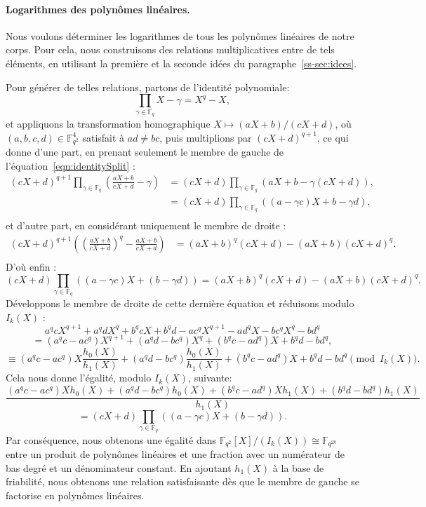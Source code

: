 \documentclass[a4paper, titlepage, 11pt]{article}
\theoremstyle{definition}
\theoremstyle{remark}
\def\gf #1{\mathbb{F}_{#1}}
\begin{document}
\paragraph{Logarithmes des polynômes linéaires.}Nous voulons déterminer les logarithmes de tous les polynômes linéaires de notre corps. Pour cela, nous construisons des relations multiplicatives entre de tels éléments, en utilisant la première et la seconde idées du paragraphe~\ref{ss-sec:idees}.

Pour générer de telles relations, partons de l'identité polynomiale:
\begin{equation}\label{eqn:identitySplit}
\prod_{\gamma\in\gf{q}} X-\gamma = X^q-X,
\end{equation}
et appliquons la transformation homographique $X \mapsto (aX+b)/(cX+d)$, où $(a,b,c,d)\in\gf{q^2}^4$ satisfait à $ad\neq bc$, puis multiplions par $(cX+d)^{q+1}$, ce qui donne d'une part, en prenant seulement le membre de gauche de l'équation~\ref{eqn:identitySplit} :
\begin{align*}
(cX+d)^{q+1} \prod_{\gamma\in\gf{q}} \left(\frac{aX+b}{cX+d}-\gamma\right) &= (cX+d) \prod_{\gamma\in\gf{q}} (aX+b-\gamma(cX+d)), \\ 
&= (cX+d) \prod_{\gamma\in\gf{q}} ((a-\gamma c)X+b-\gamma d),\\
\end{align*}
et d'autre part, en considérant uniquement le membre de droite :
\begin{align*}
(cX+d)^{q+1}\left({\left(\frac{aX+b}{cX+d}\right)}^q - \frac{aX+b}{cX+d}\right) &= (aX+b)^q(cX+d) - (aX+b)(cX+d)^q. \\
\end{align*}
D'où enfin :
$$(cX+d) \prod_{\gamma\in\gf{q}}((a-\gamma c)X + (b-\gamma d)) = (aX+b)^q(cX+d) - (aX+b)(cX+d)^q.$$
Développons le membre de droite de cette dernière équation et réduisons modulo $I_k(X)$ :
$$a^qcX^{q+1} + a^qdX^q + b^qcX + b^qd - ac^qX^{q+1} - ad^qX - bc^qX^q - bd^q$$
$$= (a^qc - ac^q)X^{q+1} + (a^qd - bc^q)X^q + (b^qc - ad^q)X + b^qd - bd^q,$$
$$\equiv (a^qc - ac^q)X\frac{h_0(X)}{h_1(X)} + (a^qd - bc^q)\frac{h_0(X)}{h_1(X)} + (b^qc - ad^q)X + b^qd - bd^q \pmod{I_k(X)}.$$
Cela nous donne l'égalité, modulo $I_k(X)$, suivante:
$$\frac{(a^qc - ac^q)Xh_0(X) + (a^qd - bc^q)h_0(X) + (b^qc - ad^q)Xh_1(X) + (b^qd - bd^q)h_1(X)}{h_1(X)}$$
$$= (cX+d) \prod_{\gamma\in\gf{q}}((a-\gamma c)X + (b-\gamma d)).$$
Par conséquence, nous obtenons une égalité dans $\gf{q^2}[X]/(I_k(X)) \cong \gf{q^{2k}}$ entre un produit de polynômes linéaires et une fraction avec un numérateur de bas degré et un dénominateur constant. En ajoutant $h_1(X)$ à la base de friabilité, nous obtenons une relation satisfaisante dès que le membre de gauche se factorise en polynômes linéaires.
\end{document}
